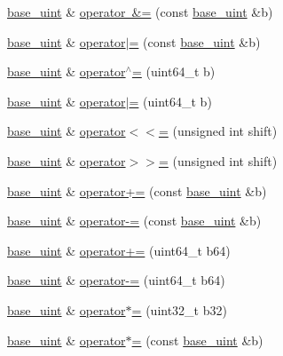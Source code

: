 \begin{DoxyCompactItemize}
\item 
\mbox{\hyperlink{classbase__uint}{base\+\_\+uint}} \& \mbox{\hyperlink{classbase__uint_ae2a17c19cd8f9f6dde651db0e0fc531a}{operator \&=}} (const \mbox{\hyperlink{classbase__uint}{base\+\_\+uint}} \&b)
\item 
\mbox{\hyperlink{classbase__uint}{base\+\_\+uint}} \& \mbox{\hyperlink{classbase__uint_ab116d89cbae68b32fbecf5d1de98bb2e}{operator$\vert$=}} (const \mbox{\hyperlink{classbase__uint}{base\+\_\+uint}} \&b)
\item 
\mbox{\hyperlink{classbase__uint}{base\+\_\+uint}} \& \mbox{\hyperlink{classbase__uint_a3d77324f5c5166e4dabadac360bea6e7}{operator$^\wedge$=}} (uint64\+\_\+t b)
\item 
\mbox{\hyperlink{classbase__uint}{base\+\_\+uint}} \& \mbox{\hyperlink{classbase__uint_ac8edb6e097d9eede21f8fa44e9184913}{operator$\vert$=}} (uint64\+\_\+t b)
\item 
\mbox{\hyperlink{classbase__uint}{base\+\_\+uint}} \& \mbox{\hyperlink{classbase__uint_acb449d2fcb5af767fa6b01890e836a4e}{operator$<$$<$=}} (unsigned int shift)
\item 
\mbox{\hyperlink{classbase__uint}{base\+\_\+uint}} \& \mbox{\hyperlink{classbase__uint_a4e0344432bbcce79525fd2c182173b3b}{operator$>$$>$=}} (unsigned int shift)
\item 
\mbox{\hyperlink{classbase__uint}{base\+\_\+uint}} \& \mbox{\hyperlink{classbase__uint_a8fb3109e7c46536bb66ac41242176246}{operator+=}} (const \mbox{\hyperlink{classbase__uint}{base\+\_\+uint}} \&b)
\item 
\mbox{\hyperlink{classbase__uint}{base\+\_\+uint}} \& \mbox{\hyperlink{classbase__uint_a89d8332840076ec102839b8a10dda9b4}{operator-\/=}} (const \mbox{\hyperlink{classbase__uint}{base\+\_\+uint}} \&b)
\item 
\mbox{\hyperlink{classbase__uint}{base\+\_\+uint}} \& \mbox{\hyperlink{classbase__uint_a14f2b12970b3198d65abafb2615207ca}{operator+=}} (uint64\+\_\+t b64)
\item 
\mbox{\hyperlink{classbase__uint}{base\+\_\+uint}} \& \mbox{\hyperlink{classbase__uint_ab64f7a7a87b9af5ea345e4678b4cc1e9}{operator-\/=}} (uint64\+\_\+t b64)
\item 
\mbox{\hyperlink{classbase__uint}{base\+\_\+uint}} \& \mbox{\hyperlink{classbase__uint_aa70b7d954258d2cd4bb77721e357fd40}{operator$\ast$=}} (uint32\+\_\+t b32)
\item 
\mbox{\hyperlink{classbase__uint}{base\+\_\+uint}} \& \mbox{\hyperlink{classbase__uint_a806b2ba843181e9dd4c824414fbcc13d}{operator$\ast$=}} (const \mbox{\hyperlink{classbase__uint}{base\+\_\+uint}} \&b)

\end{DoxyCompactItemize}
